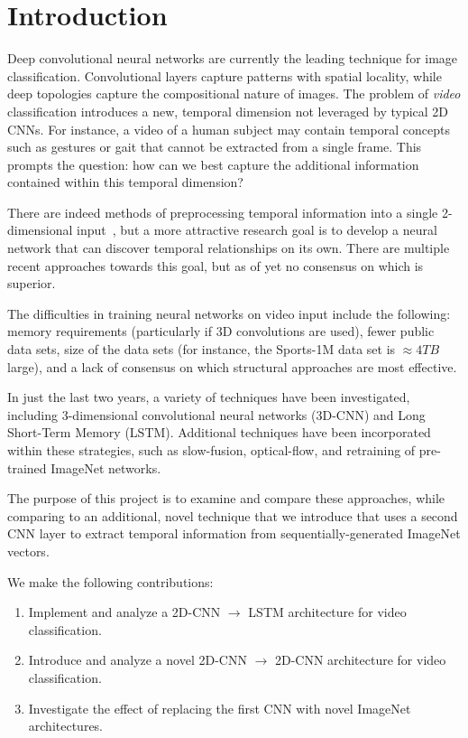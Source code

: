\section{Introduction}
Deep convolutional neural networks are currently the leading technique for image classification.
Convolutional layers capture patterns with spatial locality, while deep topologies capture the compositional nature of images.
The problem of \emph{video} classification introduces a new, temporal dimension not leveraged by typical 2D CNNs. For instance, a video of a human subject may contain temporal concepts such as gestures or gait that cannot be extracted from a single frame. This prompts the question:
 how can we best capture the additional information contained within this temporal dimension?   

There are indeed methods of preprocessing temporal information into a single 2-dimensional input~\cite{brox}, but a more attractive research goal is to develop a neural network that can discover temporal relationships on its own.
There are multiple recent approaches towards this goal, but as of yet no consensus on which is superior.

The difficulties in training neural networks on video input include the following: memory requirements (particularly if 3D convolutions are used), fewer public data sets, size of the data sets (for instance, the Sports-1M data set is $\approx 4TB$ large), and a lack of consensus on which structural approaches are most effective.

In just the last two years, a variety of techniques have been investigated, including 3-dimensional convolutional neural networks (3D-CNN) and Long Short-Term Memory (LSTM). Additional techniques have been incorporated within these strategies, such as slow-fusion, optical-flow, and retraining of pre-trained ImageNet networks.

The purpose of this project is to examine and compare these approaches, while comparing to an additional, novel technique that we introduce that uses a second CNN layer to extract temporal information from sequentially-generated ImageNet vectors. 

We make the following contributions:
\begin{enumerate}
\item Implement and analyze a 2D-CNN $\to$ LSTM architecture for video classification.
\item Introduce and analyze a novel 2D-CNN $\to$ 2D-CNN architecture for video classification. 
\item Investigate the effect of replacing the first CNN with novel ImageNet architectures.
\end{enumerate}


